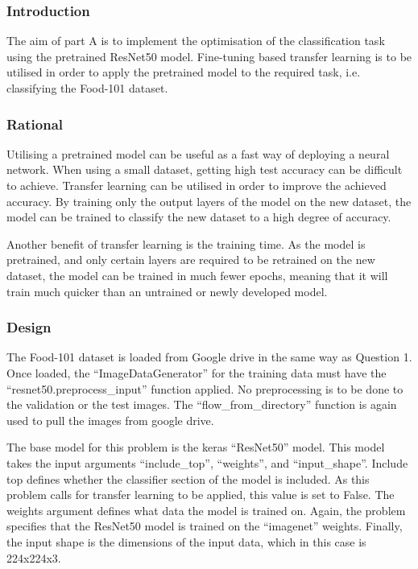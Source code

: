 \subsubsection{Introduction}

The aim of part A is to implement the optimisation of the classification task
using the pretrained ResNet50 model. Fine-tuning based transfer learning is to
be utilised in order to apply the pretrained model to the required task, i.e.
classifying the Food-101 dataset.

\subsubsection{Rational}

Utilising a pretrained model can be useful as a fast way of deploying a neural
network. When using a small dataset, getting high test accuracy can be difficult
to achieve. Transfer learning can be utilised in order to improve the achieved
accuracy. By training only the output layers of the model on the new dataset,
the model can be trained to classify the new dataset to a high degree of
accuracy.

Another benefit of transfer learning is the training time. As the model is
pretrained, and only certain layers are required to be retrained on the new
dataset, the model can be trained in much fewer epochs, meaning that it will
train much quicker than an untrained or newly developed model.

\subsubsection{Design}

The Food-101 dataset is loaded from Google drive in the same way as Question 1.
Once loaded, the ``ImageDataGenerator'' for the training data must have the
``resnet50.preprocess\_input'' function applied. No preprocessing is to be done
to the validation or the test images. The ``flow\_from\_directory'' function is
again used to pull the images from google drive.

The base model for this problem is the keras ``ResNet50'' model. This model
takes the input arguments ``include\_top'', ``weights'', and ``input\_shape''.
Include top defines whether the classifier section of the model is included. As
this problem calls for transfer learning to be applied, this value is set to
False. The weights argument defines what data the model is trained on. Again,
the problem specifies that the ResNet50 model is trained on the ``imagenet''
weights. Finally, the input shape is the dimensions of the input data, which in
this case is 224x224x3.

